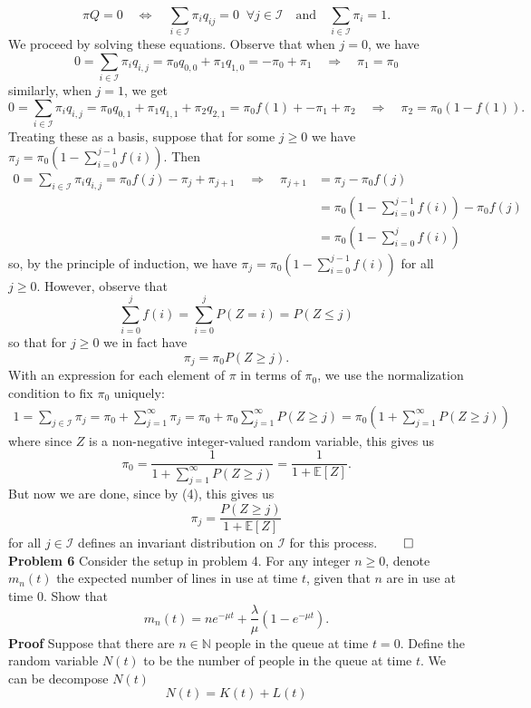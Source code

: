 \documentclass[11pt, letterpaper]{article}
\newcommand{\mbb}[1]{\mathbb{#1}}
\newcommand{\mc}[1]{\mathcal{#1}}
\begin{document}
    \[\pi Q=0\quad\Leftrightarrow\quad \sum_{i\in\mc{I}}\pi_iq_{ij}=0\;\;\forall j\in\mc{I}\quad\text{and}\quad\sum_{i\in\mc{I}}\pi_i=1.\]
    We proceed by solving these equations. Observe that when $j=0$, we have
    \[0=\sum_{i\in\mc{I}}\pi_iq_{i,j}=\pi_0q_{0,0}+\pi_1q_{1,0}=-\pi_0+\pi_1\quad\Rightarrow\quad \pi_1=\pi_0\]
    similarly, when $j=1$, we get
    \[0=\sum_{i\in\mc{I}}\pi_iq_{i,j}=\pi_0q_{0,1}+\pi_1q_{1,1}+\pi_2q_{2,1}=\pi_0f(1)+-\pi_1+\pi_2\quad\Rightarrow\quad \pi_2=\pi_0(1-f(1)).\]
    Treating these as a basis, suppose that for some $j\geq 0$ we have $\pi_j=\pi_0(1-\sum_{i=0}^{j-1}f(i))$. Then
    \begin{align*}
        0=\sum_{i\in\mc{I}}\pi_iq_{i,j}=\pi_0f(j)-\pi_{j}+\pi_{j+1}\quad\Rightarrow\quad \pi_{j+1}&=\pi_j-\pi_0f(j)\\
        &=\pi_0\left(1-\sum_{i=0}^{j-1}f(i)\right)-\pi_0f(j)\\
        &=\pi_0\left(1-\sum_{i=0}^jf(i)\right)
    \end{align*}
    so, by the principle of induction, we have $\pi_j=\pi_0(1-\sum_{i=0}^{j-1}f(i))$ for all $j\geq 0$. However, observe that
    \[\sum_{i=0}^{j}f(i)=\sum_{i=0}^{j}P(Z=i)=P(Z\leq j)\]
    so that for $j\geq 0$ we in fact have
    \[\pi_j=\pi_0P(Z\geq j).\tag{4}\]
    With an expression for each element of $\pi$ in terms of $\pi_0$, we use the normalization condition to fix $\pi_0$ uniquely:
    \begin{align*}
       1=\sum_{j\in\mc{I}}\pi_j=\pi_0+\sum_{j=1}^\infty\pi_j=\pi_0+\pi_0\sum_{j=1}^\infty P(Z\geq j)=\pi_0\left(1+\sum_{j=1}^\infty P(Z\geq j)\right)
    \end{align*}
    where since $Z$ is a non-negative integer-valued random variable, this gives us
    \[\pi_0=\frac{1}{1+\sum_{j=1}^\infty P(Z\geq j)}=\frac{1}{1+\mbb{E}[Z]}.\]
    But now we are done, since by (4), this gives us
    \[\pi_j=\frac{P(Z\geq j)}{1+\mbb{E}[Z]}\]
    for all $j\in\mc{I}$ defines an invariant distribution on $\mc{I}$ for this process.\hfill{$\qed$}\\[10pt]
    {\bf Problem 6} Consider the setup in problem 4. For any integer $n\geq 0$, denote $m_n(t)$ the expected number of lines in use at time $t$, given that $n$
    are in use at time $0$. Show that
    \[m_n(t)=ne^{-\mu t}+\frac{\lambda}{\mu}(1-e^{-\mu t}).\]
    {\bf Proof} Suppose that there are $n\in\mbb{N}$ people in the queue at time $t=0$. Define the random variable $N(t)$ to be the number of people in the queue at time $t$.
    We can be decompose $N(t)$
    \[N(t)=K(t)+L(t)\]
\end{document}
